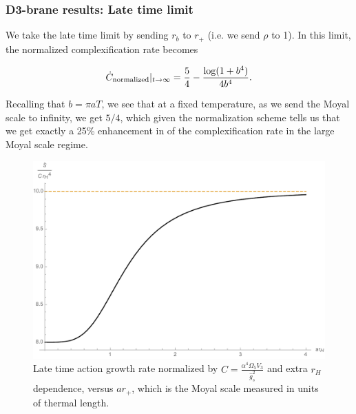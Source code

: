\documentclass[8pt,aspectratio=169]{beamer}
\begin{document}
\begin{frame}
\frametitle{D3-brane results: Late time limit}

We take the late time limit by sending $r_b$ to $r_+$ (i.e. we send $\rho$ to 1). In this limit, the normalized complexification rate becomes

\begin{equation}
\dot{C}_{\text{normalized}} \large|_{t\rightarrow \infty} = \frac{5}{4}-\frac{\log(1+b^4)}{4 b^4}.
\end{equation}

Recalling that $b = \pi a T$, we see that at a fixed temperature, as we send the Moyal scale to infinity, we get $5/4$, which given the normalization scheme tells us that we get exactly a 25\% enhancement in of the complexification rate in the large Moyal scale regime.

\begin{figure}[htbp]
    \begin{center}
        \includegraphics[scale=0.3]{LateTime}
    \end{center}
    \caption{Late time action growth rate normalized by $C=\frac{\alpha^4 \Omega_5 V_3}{\hat{g}_s^2}$ and extra $r_H$ dependence, versus $a r_+$, which is the Moyal scale measured in units of thermal length.} 
    \label{fig:LateTime}
\end{figure}

\end{frame}
\end{document}
